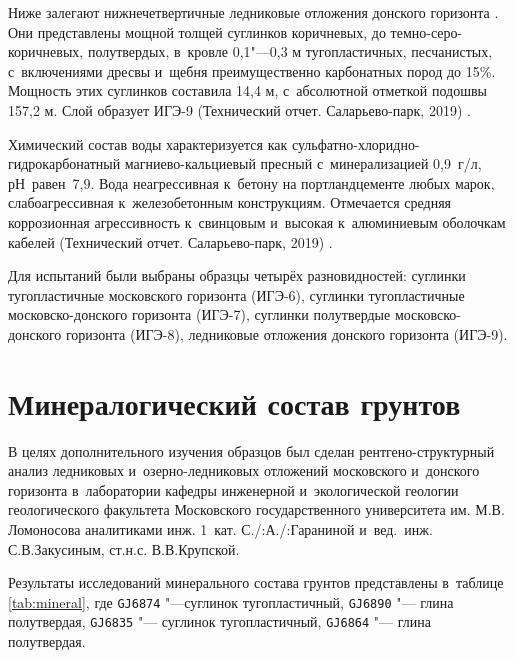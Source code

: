 Ниже залегают нижнечетвертичные ледниковые отложения донского горизонта . Они представлены мощной толщей суглинков коричневых, до темно-серо-коричневых, полутвердых, в~кровле 0,1"---0,3 м тугопластичных, песчанистых, с~включениями дресвы и~щебня преимущественно карбонатных пород до 15\%. Мощность этих суглинков составила 14,4 м, с~абсолютной отметкой подошвы 157,2 м. Слой образует ИГЭ-9 (Технический отчет. Саларьево-парк, 2019) \cite{moshkin2019}.

Химический состав воды характеризуется как сульфатно-хлоридно-гидрокарбонатный магниево-кальциевый пресный с~минерализацией 0,9~г/л, рН~равен~7,9. Вода неагрессивная к~бетону на портландцементе любых марок, слабоагрессивная к~железобетонным конструкциям. Отмечается средняя коррозионная агрессивность к~свинцовым и~высокая к~алюминиевым оболочкам кабелей (Технический отчет. Саларьево-парк, 2019) \cite{moshkin2019}.


Для испытаний были выбраны образцы четырёх разновидностей: суглинки тугопластичные московского горизонта (ИГЭ-6), суглинки тугопластичные московско-донского горизонта (ИГЭ-7), суглинки полутвердые московско-донского горизонта (ИГЭ-8), ледниковые отложения донского горизонта (ИГЭ-9). 




 \section{Минералогический состав грунтов} 

В целях дополнительного изучения образцов был сделан рентгено-структурный анализ 
ледниковых и~озерно-ледниковых отложений московского и~донского горизонта 
в~лаборатории кафедры инженерной и~экологической геологии 
геологического факультета Московского государственного университета им. М.В. Ломоносова 
аналитиками инж. 1~кат. С./:А./:Гараниной и~вед.~инж. С.\:В.\:Закусиным, ст.\:н.\:с. В.\:В.\:Крупской.


Результаты исследований минерального состава грунтов представлены в~таблице \ref{tab:mineral}, где \texttt{GJ6874} "---суглинок тугопластичный, \texttt{GJ6890} "--- глина полутвердая, \texttt{GJ6835} "--- суглинок тугопластичный, \texttt{GJ6864} "--- глина полутвердая.



